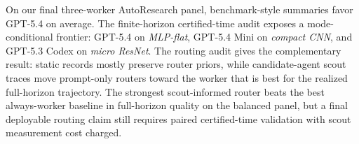 \documentclass{article}
\begin{document}
{On our final three-worker AutoResearch panel, benchmark-style summaries favor GPT-5.4 on average.
The finite-horizon certified-time audit exposes a mode-conditional frontier: GPT-5.4 on \textit{MLP-flat}, GPT-5.4 Mini on \textit{compact CNN}, and GPT-5.3 Codex on \textit{micro ResNet}.
The routing audit gives the complementary result: static records mostly preserve router priors, while candidate-agent scout traces move prompt-only routers toward the worker that is best for the realized full-horizon trajectory.
The strongest scout-informed router beats the best always-worker baseline in full-horizon quality on the balanced panel, but a final deployable routing claim still requires paired certified-time validation with scout measurement cost charged.
}



\end{document}
